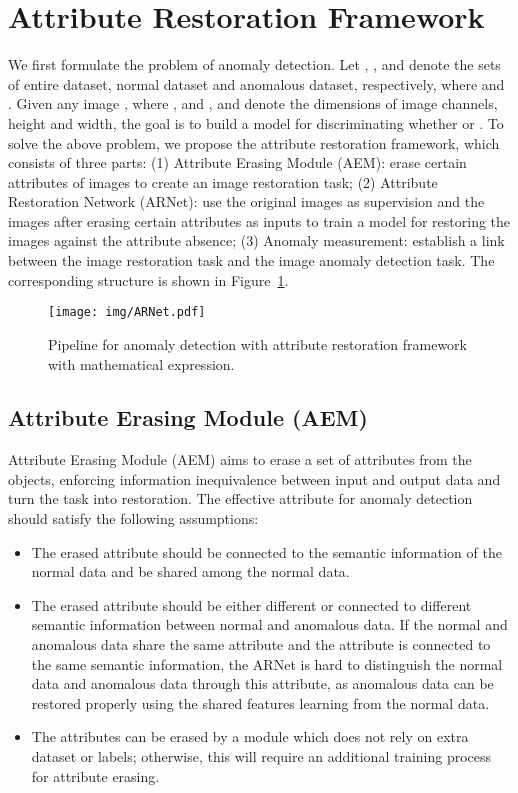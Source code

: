 \documentclass[journal]{IEEEtran}
\begin{document}
\section{Attribute Restoration Framework}
We first formulate the problem of anomaly detection. 
Let , , and  denote the sets of entire dataset, normal dataset and anomalous dataset, respectively, where  and . Given any image , where , and ,  and  denote the dimensions of image channels, height and width, the goal is to build a model  for discriminating whether  or . To solve the above problem, we propose the attribute restoration framework, which consists of three parts: (1) Attribute Erasing Module (AEM): erase certain attributes of images to create an image restoration task; (2) Attribute Restoration Network (ARNet): use the original images as supervision and the images after erasing certain attributes as inputs to train a model for restoring the images against the attribute absence; (3) Anomaly measurement: establish a link between the image restoration task and the image anomaly detection task. The corresponding structure is shown in Figure~\ref{img:ARNet}. 

\begin{figure}[t]
\centering
\texttt{[image: img/ARNet.pdf]}
\caption{Pipeline for anomaly detection with attribute restoration framework with mathematical expression.}
\label{img:ARNet}
\end{figure}

\subsection{Attribute Erasing Module (AEM)}\label{method}
Attribute Erasing Module (AEM) aims to erase a set of attributes from the objects, enforcing information inequivalence between input and output data and turn the task into restoration. The effective attribute for anomaly detection should satisfy the following assumptions:
\begin{itemize}
    \item The erased attribute should be connected to the semantic information of the normal data and be shared among the normal data.
    \item The erased attribute should be either different or connected to different semantic information between normal and anomalous data. If the normal and anomalous data share the same attribute and the attribute is connected to the same semantic information, the ARNet is hard to distinguish the normal data and anomalous data through this attribute, as anomalous data can be restored properly using the shared features learning from the normal data.
    \item The attributes can be erased by a module which does not rely on extra dataset or labels; otherwise, this will require an additional training process for attribute erasing.
\end{itemize}
\end{document}
